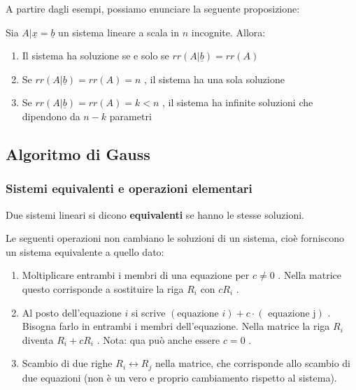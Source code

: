\documentclass[
  a4paper,
]{article}
\providecommand{\tightlist}{%
  \setlength{\itemsep}{0pt}\setlength{\parskip}{0pt}}
\providecommand{\tightlist}{}
\begin{document}
A partire dagli esempi, possiamo enunciare la seguente proposizione:

\begin{propositionbox}
Sia \(A|\underline{x} = \underline{b}\) un sistema lineare a scala in
\(n\) incognite. Allora:

\begin{enumerate}
\def\labelenumi{\arabic{enumi}.}
\tightlist
\item
  Il sistema ha soluzione se e solo se \(rr(A|\underline{b}) = rr(A)\)
\item
  Se \(rr(A|\underline{b}) = rr(A) = n\) , il sistema ha una sola
  soluzione
\item
  Se \(rr(A|\underline{b}) = rr(A) = k < n\) , il sistema ha infinite
  soluzioni che dipendono da \(n - k\) parametri
\end{enumerate}
\end{propositionbox}

\hypertarget{algoritmo-di-gauss}{%
\subsection{Algoritmo di Gauss}\label{algoritmo-di-gauss}}

\hypertarget{sistemi-equivalenti-e-operazioni-elementari}{%
\subsubsection{Sistemi equivalenti e operazioni
elementari}\label{sistemi-equivalenti-e-operazioni-elementari}}

\begin{definitionbox}
Due sistemi lineari si dicono \textbf{equivalenti} se hanno le stesse
soluzioni.
\end{definitionbox}

Le seguenti operazioni non cambiano le soluzioni di un sistema, cioè
forniscono un sistema equivalente a quello dato:

\begin{enumerate}
\def\labelenumi{\arabic{enumi}.}
\tightlist
\item
  Moltiplicare entrambi i membri di una equazione per \(c \not = 0\) .
  Nella matrice questo corrisponde a sostituire la riga \(R_i\) con
  \(cR_i\) .
\item
  Al posto dell'equazione \(i\) si scrive
  \((\text{equazione } i) + c \cdot (\text{ equazione j})\) . Bisogna
  farlo in entrambi i membri dell'equazione. Nella matrice la riga
  \(R_i\) diventa \(R_i + cR_i\) . Nota: qua può anche essere \(c = 0\)
  .
\item
  Scambio di due righe \(R_i \leftrightarrow R_j\) nella matrice, che
  corrisponde allo scambio di due equazioni (non è un vero e proprio
  cambiamento rispetto al sistema).
\end{enumerate}
\end{document}
